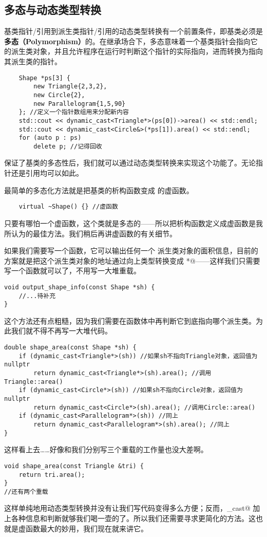 \subsection*{多态与动态类型转换}
基类指针/引用到派生类指针/引用的动态类型转换有一个前置条件，即基类必须是\textbf{多态（Polymorphism）}的。在继承场合下，多态意味着一个基类指针会指向它的派生类对象，并且允许程序在运行时判断这个指针的实际指向，进而转换为指向其派生类的指针。
\begin{lstlisting}
    Shape *ps[3] {
        new Triangle{2,3,2},
        new Circle{2},
        new Parallelogram{1,5,90}   
    }; //定义一个指针数组用来分配新内容
    std::cout << dynamic_cast<Triangle*>(ps[0])->area() << std::endl;
    std::cout << dynamic_cast<Circle&>(*ps[1]).area() << std::endl;
    for (auto p : ps)
        delete p; //记得回收
\end{lstlisting}
保证了基类的多态性后，我们就可以通过动态类型转换来实现这个功能了。无论指针还是引用均可以如此。\par
最简单的多态化方法就是把基类的析构函数变成 \lstinline@virtual@ 的虚函数。
\begin{lstlisting}
    virtual ~Shape() {} //虚函数
\end{lstlisting}
只要有哪怕一个虚函数，这个类就是多态的——所以把析构函数定义成虚函数是我所认为的最佳方法。我们稍后再讲虚函数的有关细节。\par
如果我们需要写一个函数，它可以输出任何一个 \lstinline@Shape@ 派生类对象的面积信息，目前的方案就是把这个派生类对象的地址通过向上类型转换变成 \lstinline@Shape*@——这样我们只需要写一个函数就可以了，不用写一大堆重载。
\begin{lstlisting}
void output_shape_info(const Shape *sh) {
    //...待补充
}
\end{lstlisting}
这个方法还有点粗糙，因为我们需要在函数体中再判断它到底指向哪个派生类。为此我们就不得不再写一大堆代码。
\begin{lstlisting}
double shape_area(const Shape *sh) {
    if (dynamic_cast<Triangle*>(sh)) //如果sh不指向Triangle对象，返回值为nullptr
        return dynamic_cast<Triangle*>(sh).area(); //调用Triangle::area()
    if (dynamic_cast<Circle*>(sh)) //如果sh不指向Circle对象，返回值为nullptr
        return dynamic_cast<Circle*>(sh).area(); //调用Circle::area()
    if (dynamic_cast<Parallelogram*>(sh)) //同上
        return dynamic_cast<Parallelogram*>(sh).area(); //同上
}
\end{lstlisting}
这样看上去……好像和我们分别写三个重载的工作量也没大差啊。
\begin{lstlisting}
void shape_area(const Triangle &tri) {
    return tri.area();
}
//还有两个重载
\end{lstlisting}\par
这样单纯地用动态类型转换并没有让我们写代码变得多么方便；反而，\lstinline@dynamic_cast@ 加上各种信息和判断就够我们喝一壶的了。所以我们还需要寻求更简化的方法。这也就是虚函数最大的妙用，我们现在就来讲它。\par
